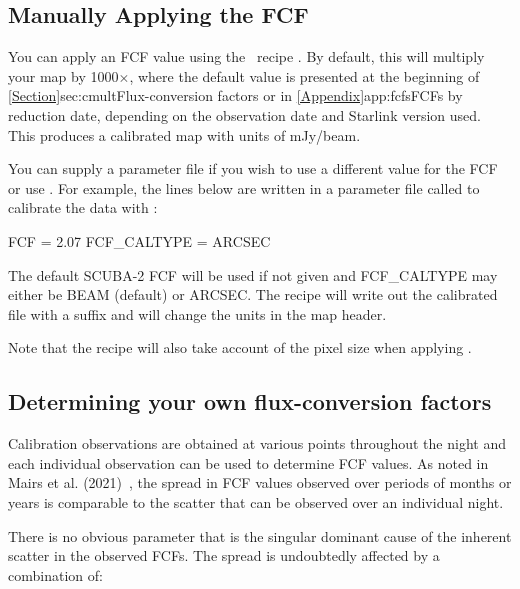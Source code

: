 \subsection{Manually Applying the FCF}
\label{subsec:ApplyingFCF}

You can apply an FCF value using the \picard\ recipe
.
By default, this will multiply your map by 1000$\times$\fcfb, where the default \fcfb
value is presented at the beginning of \cref{Section}{sec:cmult}{Flux-conversion factors}
or in \cref{Appendix}{app:fcfs}{FCFs by reduction date},
depending on the observation date and Starlink version used. This produces a
calibrated map with units of mJy/beam.

You can supply a parameter file if you wish to use a different value
for the FCF or use \fcfa. For example, the lines below are written in a parameter
file called  to calibrate the data  with :

\begin{terminalv}
FCF = 2.07
FCF_CALTYPE = ARCSEC
\end{terminalv}

The default SCUBA-2 FCF will be used if not given and FCF\_CALTYPE may either
be BEAM (default) or ARCSEC. The recipe will write out the calibrated
file with a  suffix and will change the units in the map
header.

\begin{terminalv}
\end{terminalv}

Note that the recipe will also take account of the pixel size when
applying \fcfa.


\subsection{Determining your own flux-conversion factors}
\label{sec:own_fcf}

Calibration observations are obtained at various points throughout the
night and each individual observation can be used to determine FCF values.
As noted in Mairs et al. (2021)~\cite{mairs21}, the spread in FCF values observed
over periods of months or years is comparable to the scatter that can be observed
over an individual night.

There is no obvious parameter that is the singular dominant cause of the inherent scatter
in the observed FCFs. The spread is undoubtedly affected by a combination of:

